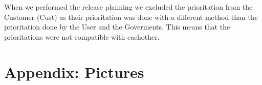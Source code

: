 \documentclass[a4paper]{article}
\begin{document}
		When we performed the release planning we excluded the prioritation from the Customer (Cust) as their prioritation was done with a different method than the prioritation done by the User and the Goverments. This means that the prioritations were not compatible with eachother.
		
		
		
				
	\newpage

	\section{Appendix: Pictures} %
		\label{sec:appendix}
		
\end{document}

